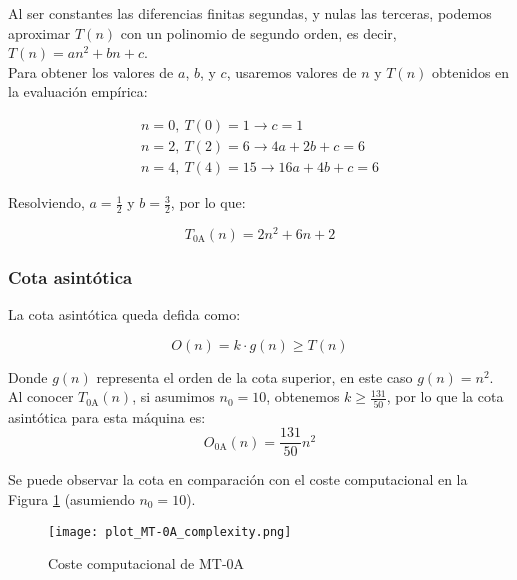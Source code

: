 Al ser constantes las diferencias finitas segundas, y nulas las terceras, podemos aproximar $T(n)$ con un polinomio de segundo orden, es decir, $T(n) = an^2 + bn + c$.\\

Para obtener los valores de $a$, $b$, y $c$, usaremos valores de $n$ y $T(n)$ obtenidos en la evaluación empírica:

\begin{subequations}
    \begin{gather}
        n = 0,\ T(0) = 1 \rightarrow c = 1 \\
        n = 2,\ T(2) = 6 \rightarrow 4a + 2b + c = 6 \\
        n = 4,\ T(4) = 15 \rightarrow 16a + 4b + c = 6
    \end{gather}
\end{subequations}

Resolviendo, $a=\frac{1}{2}$ y $b=\frac{3}{2}$, por lo que:

\begin{equation}
    T_{\mathrm{0A}}(n) = 2n^2 + 6n + 2
\end{equation}


\subsubsection*{Cota asintótica}
La cota asintótica queda defida como:

\begin{equation}
    O(n) = k \cdot g(n) \geq T(n)
    \label{eq:On}
\end{equation}

Donde $g(n)$ representa el orden de la cota superior, en este caso $g(n) = n^2$.\\

Al conocer $T_{\mathrm{0A}}(n)$, si asumimos $n_0 = 10$, obtenemos $k \geq \frac{131}{50}$, por lo que la cota asintótica para esta máquina es:
\begin{equation}
    O_{\mathrm{0A}}(n) = \frac{131}{50} n^2
\end{equation}

Se puede observar la cota en comparación con el coste computacional en la Figura \ref{fig:MT-0A_plot} (asumiendo $n_0 = 10$).

\begin{figure}[h]
    \centering
    \texttt{[image: plot\_MT-0A\_complexity.png]}
    \caption{Coste computacional de MT-0A}
    \label{fig:MT-0A_plot}
\end{figure}


